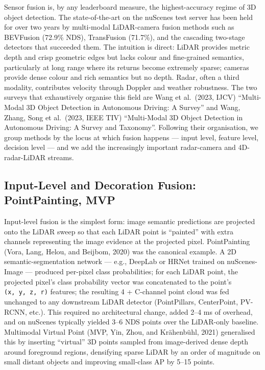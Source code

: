 Sensor fusion is, by any leaderboard measure, the highest-accuracy regime of 3D object detection. The state-of-the-art on the nuScenes test server has been held for over two years by multi-modal LiDAR-camera fusion methods such as BEVFusion (72.9\% NDS), TransFusion (71.7\%), and the cascading two-stage detectors that succeeded them. The intuition is direct: LiDAR provides metric depth and crisp geometric edges but lacks colour and fine-grained semantics, particularly at long range where its returns become extremely sparse; cameras provide dense colour and rich semantics but no depth. Radar, often a third modality, contributes velocity through Doppler and weather robustness. The two surveys that exhaustively organise this field are Wang et al.~(2023, IJCV) ``Multi-Modal 3D Object Detection in Autonomous Driving: A Survey'' and Wang, Zhang, Song et al.~(2023, IEEE TIV) ``Multi-Modal 3D Object Detection in Autonomous Driving: A Survey and Taxonomy''. Following their organisation, we group methods by the locus at which fusion happens --- input level, feature level, decision level --- and we add the increasingly important radar-camera and 4D-radar-LiDAR streams.

\subsection{Input-Level and Decoration Fusion: PointPainting, MVP}\label{input-level-and-decoration-fusion-pointpainting-mvp}

Input-level fusion is the simplest form: image semantic predictions are projected onto the LiDAR sweep so that each LiDAR point is ``painted'' with extra channels representing the image evidence at the projected pixel. PointPainting (Vora, Lang, Helou, and Beijbom, 2020) was the canonical example. A 2D semantic-segmentation network --- e.g., DeepLab or HRNet trained on nuScenes-Image --- produced per-pixel class probabilities; for each LiDAR point, the projected pixel's class probability vector was concatenated to the point's \texttt{(x,\ y,\ z,\ r)} features; the resulting 4 + C-channel point cloud was fed unchanged to any downstream LiDAR detector (PointPillars, CenterPoint, PV-RCNN, etc.). This required no architectural change, added 2--4 ms of overhead, and on nuScenes typically yielded 3--6 NDS points over the LiDAR-only baseline. Multimodal Virtual Point (MVP, Yin, Zhou, and Krähenbühl, 2021) generalised this by inserting ``virtual'' 3D points sampled from image-derived dense depth around foreground regions, densifying sparse LiDAR by an order of magnitude on small distant objects and improving small-class AP by 5--15 points.

